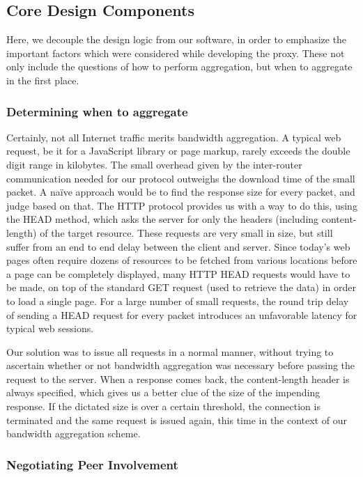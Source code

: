 \documentclass[12pt]{article}
\begin{document}
	\subsection{Core Design Components}

		Here, we decouple the design logic from our software, in order to emphasize the important factors which were considered while developing the proxy. These not only include the questions of how to perform aggregation, but when to aggregate in the first place.

		\subsubsection{Determining when to aggregate}

			Certainly, not all Internet traffic merits bandwidth aggregation. A typical web request, be it for a JavaScript library or page markup, rarely exceeds the double digit range in kilobytes. The small overhead given by the inter-router communication needed for our protocol outweighs the download time of the small packet. A na\"{i}ve approach would be to find the response size for every packet, and judge based on that. The HTTP protocol provides us with a way to do this, using the HEAD method, which asks the server for only the headers (including content-length) of the target resource. These requests are very small in size, but still suffer from an end to end delay between the client and server. Since today's web pages often require dozens of resources to be fetched from various locations before a page can be completely displayed, many HTTP HEAD requests would have to be made, on top of the standard GET request (used to retrieve the data) in order to load a single page. For a large number of small requests, the round trip delay of sending a HEAD request for every packet introduces an unfavorable latency for typical web sessions. 

			Our solution was to issue all requests in a normal manner, without trying to ascertain whether or not bandwidth aggregation was necessary before passing the request to the server. When a response comes back, the content-length header is always specified, which gives us a better clue of the size of the impending response. If the dictated size is over a certain threshold, the connection is terminated and the same request is issued again, this time in the context of our bandwidth aggregation scheme.

		\subsubsection{Negotiating Peer Involvement}
\end{document}
